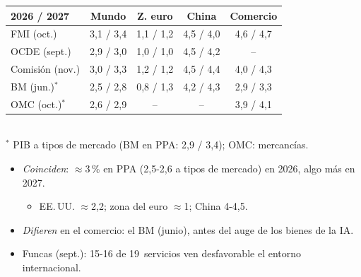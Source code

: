 \documentclass{article}
\begin{document}
\begin{columnas}
\begin{center}\footnotesize
\begin{tabular}{@{}lcccc@{}}
\toprule
2026 / 2027 & Mundo & Z. euro & China & Comercio\\
\midrule
FMI (oct.) & 3,1 / 3,4 & 1,1 / 1,2 & 4,5 / 4,0 & 4,6 / 4,7\\
OCDE (sept.) & 2,9 / 3,0 & 1,0 / 1,0 & 4,5 / 4,2 & --\\
Comisión (nov.) & 3,0 / 3,3 & 1,2 / 1,2 & 4,5 / 4,4 & 4,0 / 4,3\\
BM (jun.)$^{*}$ & 2,5 / 2,8 & 0,8 / 1,3 & 4,2 / 4,3 & 2,9 / 3,3\\
OMC (oct.)$^{*}$ & 2,6 / 2,9 & -- & -- & 3,9 / 4,1\\
\bottomrule
\end{tabular}\\
{\scriptsize $^{*}$ PIB a tipos de mercado (BM en PPA: 2,9 / 3,4); OMC: mercancías.}
\end{center}
\begin{itemize}
\item \emph{Coinciden}: $\approx$3\,\% en PPA (2,5-2,6 a tipos de mercado) en 2026, algo más en 2027.
  \begin{itemize}
  \item EE.\,UU. $\approx$2,2; zona del euro $\approx$1; China 4-4,5.
  \end{itemize}
\item \emph{Difieren} en el comercio: el BM (junio), antes del auge de los bienes de la IA.
\item Funcas (sept.): 15-16 de 19~servicios ven desfavorable el entorno internacional.
\end{itemize}


\end{columnas}
\end{document}
